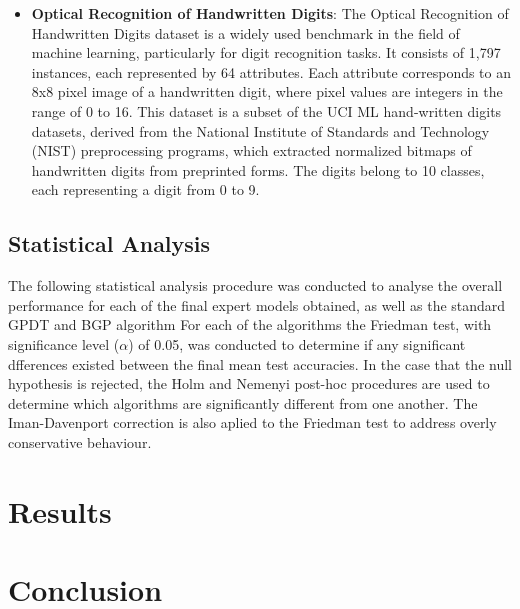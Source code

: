 \documentclass[conference]{IEEEtran}
\begin{document}
\begin{itemize}
        \item \textbf{Optical Recognition of Handwritten Digits}: The Optical Recognition of Handwritten Digits dataset is a 
        widely used benchmark in the field of machine learning, particularly for digit recognition tasks. It consists of 1,797 
        instances, each represented by 64 attributes. Each attribute corresponds to an 8x8 pixel image of a handwritten digit, 
        where pixel values are integers in the range of 0 to 16. This dataset is a subset of the UCI ML hand-written digits datasets, 
        derived from the National Institute of Standards and Technology (NIST) preprocessing programs, which extracted normalized 
        bitmaps of handwritten digits from preprinted forms. The digits belong to 10 classes, each representing a digit from 0 to 9.
    \end{itemize}


    \subsection{Statistical Analysis}

        The following statistical analysis procedure was conducted to analyse the overall performance for each of the final expert models
        obtained, as well as the standard GPDT and BGP algorithm For each of the algorithms the Friedman test, with significance level ($\alpha$) of 0.05,
        was conducted to determine if any significant dfferences existed between the final mean test accuracies. In the case that the null
        hypothesis is rejected, the Holm and Nemenyi post-hoc procedures are used to determine which algorithms are significantly different from
        one another. The Iman-Davenport correction is also aplied to the Friedman test to address overly conservative behaviour.

\section{Results}


\section{Conclusion}




\end{document}
